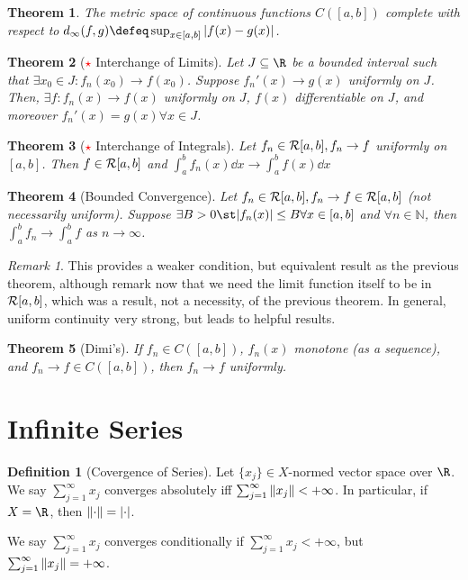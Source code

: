 \documentclass[12pt, oneside]{article}
\theoremstyle{definition}
\newtheorem{defn}{Definition}
\theoremstyle{plain}
\newtheorem{thm}{Theorem}
\theoremstyle{remark}
\newtheorem{remark}{Remark}
\let\origsection=\section
\renewcommand\section[1]{\origsection{#1}\label{sec:\thesection}}
\begin{document}
\begin{thm}
  The metric space of continuous functions $C([a, b])$ complete with respect to $d_\infty(f, g) \defeq \sup_{x \in [a, b]}\abs{f(x) - g(x)}$.
\end{thm}

\begin{thm}[\textcolor{red}{$\star$} Interchange of Limits]
  Let $J \subseteq \R$ be a bounded interval such that $\exists x_0 \in J : f_n(x_0) \to f(x_0)$. Suppose $f_n'(x) \to g(x)$ uniformly on $J$. Then, $\exists f : f_n (x) \to f(x)$ uniformly on $J$, $f(x)$ differentiable on $J$, and moreover $f_n'(x) = g(x) \forall x \in J$.
\end{thm}

\begin{thm}[\textcolor{red}{$\star$} Interchange of Integrals]
  Let  $f_n \in \mathcal{R}[a, b], f_n \to f$ uniformly on $[a, b]$. Then $f \in \mathcal{R}[a, b]$ and $\int_a^b f_n(x) \dd{x} \to \int_a^b f(x) \dd{x}$
\end{thm}
\begin{thm}[Bounded Convergence]
  Let $f_n \in \mathcal{R}[a, b], f_n \to f \in \mathcal{R}[a, b]$ (not necessarily uniform). Suppose $\exists B > 0 \st \abs{f_n(x)} \leq B \forall x \in [a, b]$ and $\forall n \in \mathbb{N}$, then $\int_a^b f_n \to \int_a^b f$ as $n \to \infty$.
\end{thm}
\begin{remark}
  This provides a weaker condition, but equivalent result as the previous theorem, although remark now that we need the limit function itself to be in $\mathcal{R}[a, b]$, which was a result, not a necessity, of the previous theorem. In general, uniform continuity very strong, but leads to helpful results.
\end{remark}

\begin{thm}[Dimi's]
  If $f_n \in C([a, b])$, $f_n(x)$ monotone (as a sequence), and $f_n \to f \in C([a, b])$, then $f_n \to f$ uniformly.
\end{thm}

\section{Infinite Series}

\begin{defn}[Covergence of Series]
  Let $\{x_j\} \in X$-normed vector space over $\R$. We say $\sum_{j=1}^\infty x_j$ converges absolutely iff $\sum_{j=1}^\infty \norm{x_j} < + \infty$. In particular, if $X = \R$, then $\norm{\cdot} = \abs{\cdot }$.

  We say $\sum_{j=1}^\infty x_j$ converges conditionally if $\sum_{j=1}^\infty x_j < +\infty$, but $\sum_{j=1}^\infty \norm{x_j} = +\infty$.
\end{defn}
\end{document}
